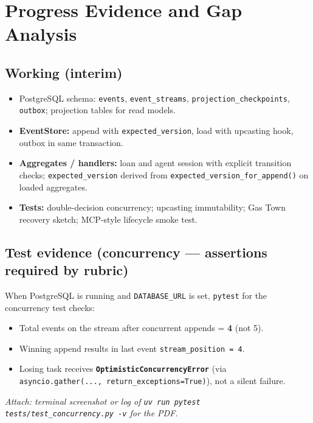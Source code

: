 \documentclass[11pt,a4paper]{article}
\begin{document}
\section{Progress Evidence and Gap Analysis}

\subsection{Working (interim)}

\begin{itemize}[leftmargin=*]
  \item PostgreSQL schema: \texttt{events}, \texttt{event\_streams}, \texttt{projection\_checkpoints}, \texttt{outbox}; projection tables for read models.
  \item \textbf{EventStore:} append with \texttt{expected\_version}, load with upcasting hook, outbox in same transaction.
  \item \textbf{Aggregates / handlers:} loan and agent session with explicit transition checks; \texttt{expected\_version} derived from \texttt{expected\_version\_for\_append()} on loaded aggregates.
  \item \textbf{Tests:} double-decision concurrency; upcasting immutability; Gas Town recovery sketch; MCP-style lifecycle smoke test.
\end{itemize}

\subsection{Test evidence (concurrency — assertions required by rubric)}

When PostgreSQL is running and \texttt{DATABASE_URL} is set, \texttt{pytest} for the concurrency test checks:
\begin{itemize}[leftmargin=*]
  \item Total events on the stream after concurrent appends = \textbf{4} (not 5).
  \item Winning append results in last event \texttt{stream\_position = 4}.
  \item Losing task receives \textbf{\texttt{OptimisticConcurrencyError}} (via \texttt{asyncio.gather(..., return\_exceptions=True)}), not a silent failure.
\end{itemize}

\noindent\textit{Attach: terminal screenshot or log of \texttt{uv run pytest tests/test\_concurrency.py -v} for the PDF.}
\end{document}
